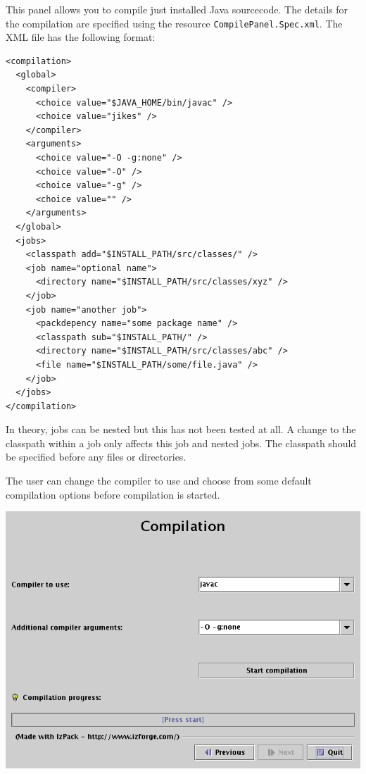 This panel allows you to compile just installed Java sourcecode. The details for the compilation are specified using the resource \texttt{CompilePanel.Spec.xml}.
The XML file has the following format:
\begin{verbatim}
<compilation>
  <global>
    <compiler>
      <choice value="$JAVA_HOME/bin/javac" />
      <choice value="jikes" />
    </compiler>
    <arguments>
      <choice value="-O -g:none" />
      <choice value="-O" />
      <choice value="-g" />
      <choice value="" />
    </arguments>
  </global>
  <jobs>
    <classpath add="$INSTALL_PATH/src/classes/" />
    <job name="optional name">
      <directory name="$INSTALL_PATH/src/classes/xyz" />
    </job>
    <job name="another job">
      <packdepency name="some package name" />
      <classpath sub="$INSTALL_PATH/" />
      <directory name="$INSTALL_PATH/src/classes/abc" />
      <file name="$INSTALL_PATH/some/file.java" />
    </job>
  </jobs>
</compilation>
\end{verbatim}

In theory, jobs can be nested but this has not been tested at all. A change to
the classpath within a job only affects this job and nested jobs. The classpath
should be specified before any files or directories.

The user can change the compiler to use and choose from some default
compilation options before compilation is started. 

\includegraphics[width=\linewidth]{img/compilePanel}

